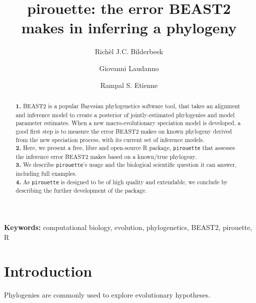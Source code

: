 \documentclass{article}
\title{pirouette: the error BEAST2 makes in inferring a phylogeny}
\author[1]{Rich\`el J.C. Bilderbeek}
\author[1]{Giovanni Laudanno}
\author[1]{Rampal S. Etienne}
\affil[1]{Groningen Institute for Evolutionary Life Sciences, University of Groningen, Groningen, The Netherlands}
\begin{document}
\maketitle

\begin{abstract}

  \textbf{1. }
    BEAST2 is a popular Bayesian phylogenetics software tool,
    that takes an alignment and inference model to create a
    posterior of jointly-estimated phylogenies and model parameter estimates.
    When a new macro-evolutionary speciation model is developed,
    a good first step is to measure the error BEAST2 makes on known
    phylogeny derived from the new speciation process, 
    with its current set of inference models. \\
  \textbf{2. }
    Here, we present a free, libre and open-source R package, \verb;pirouette;
    that assesses the inference error BEAST2 makes based on a known/true 
    phylogeny. \\
  \textbf{3. }
    We describe \verb;pirouette;'s usage and the biological scientific
    question it can answer, including full examples. \\
  \textbf{4. }
    As \verb;pirouette; is designed to be of high quality and extendable, 
    we conclude by describing the further development of the package. \\
\end{abstract}

{\bf Keywords:} computational biology, evolution, phylogenetics, BEAST2, pirouette, R





\section{Introduction}

Phylogenies are commonly used to explore evolutionary hypotheses.

\end{document}
